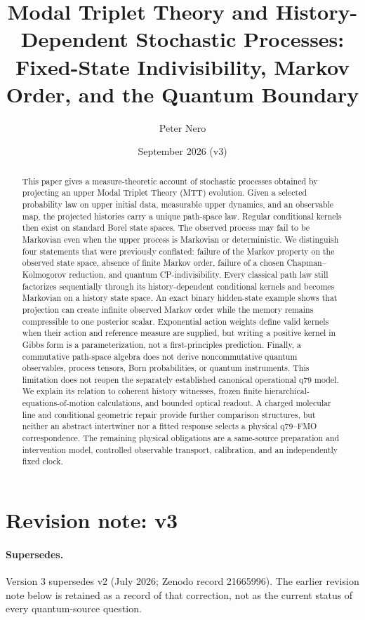 \documentclass[11pt]{article}
\title{Modal Triplet Theory and History-Dependent Stochastic Processes:\\
Fixed-State Indivisibility, Markov Order, and the Quantum Boundary}
\author{Peter Nero}
\date{September 2026 (v3)}
\theoremstyle{definition}
\theoremstyle{remark}
\begin{document}
\maketitle

\begin{abstract}
This paper gives a measure-theoretic account of stochastic processes
obtained by projecting an upper Modal Triplet Theory (MTT) evolution.  Given a
selected probability law on upper initial data, measurable upper dynamics, and
an observable map, the projected histories carry a unique path-space law.
Regular conditional kernels then exist on standard Borel state spaces.  The
observed process may fail to be Markovian even when the upper process is
Markovian or deterministic.  We distinguish four statements that were
previously conflated: failure of the Markov property on the observed state
space, absence of finite Markov order, failure of a chosen
Chapman--Kolmogorov reduction, and quantum CP-indivisibility.  Every classical
path law still factorizes sequentially through its history-dependent
conditional kernels and becomes Markovian on a history state space.  An exact
binary hidden-state example shows that projection can create infinite observed
Markov order while the memory remains compressible to one posterior scalar.
Exponential action weights define valid kernels when their action and reference
measure are supplied, but writing a positive kernel in Gibbs form is a
parameterization, not a first-principles prediction.  Finally, a commutative
path-space algebra does not derive noncommutative quantum observables,
process tensors, Born probabilities, or quantum instruments.  This limitation
does not reopen the separately established canonical operational q79 model.
We explain its relation to coherent history witnesses, frozen finite
hierarchical-equations-of-motion calculations, and bounded optical readout.
A charged molecular line and conditional geometric repair provide further
comparison structures, but neither an abstract intertwiner nor a fitted
response selects a physical q79--FMO correspondence.  The remaining physical
obligations are a same-source preparation and intervention model, controlled
observable transport, calibration, and an independently fixed clock.
\end{abstract}

\section*{Revision note: v3}
\paragraph{Supersedes.}
Version 3 supersedes v2 (July 2026; Zenodo record 21665996). The earlier
revision note below is retained as a record of that correction, not as the
current status of every quantum-source question.
\end{document}
